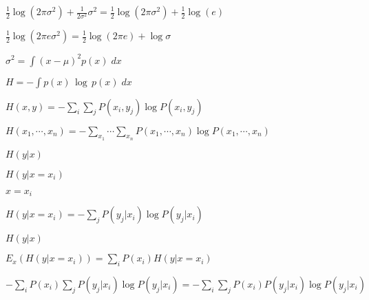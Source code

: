 \documentclass{article}
\def\lthtmlcheckvsize{\ifdim\ht\sizebox<\vsize 
  \ifdim\wd\sizebox<\hsize\expandafter\hfill\fi \expandafter\vfill
  \else\expandafter\vss\fi}%
\begin{document}
{\newpage\clearpage
{}%
$\displaystyle \frac{1}{2}\log(2\pi\sigma^2)+\frac{1}{2\sigma^2}\sigma^2
=\frac{1}{2}\log(2\pi\sigma^2)+\frac{1}{2}\log(e)$%
\lthtmlindisplaymathZ
\lthtmlcheckvsize\clearpage}

{\newpage\clearpage
{}%
$\displaystyle \frac{1}{2}\log(2\pi e\sigma^2)=\frac{1}{2}\log(2\pi e)+\log\sigma$%
\lthtmlindisplaymathZ
\lthtmlcheckvsize\clearpage}

{\newpage\clearpage
{}%
$ \sigma^2=\int (x-\mu)^2 p(x)\;dx$%
\lthtmlindisplaymathZ
\lthtmlcheckvsize\clearpage}

{\newpage\clearpage
{}%
$ H=-\int p(x)\,\log\,p(x)\;dx$%
\lthtmlindisplaymathZ
\lthtmlcheckvsize\clearpage}

{\newpage\clearpage
{}%
$\displaystyle H(x,y)=-\sum_i\sum_j P(x_i,y_j)\log P(x_i,y_j)$%
\lthtmlindisplaymathZ
\lthtmlcheckvsize\clearpage}

{\newpage\clearpage
{}%
$\displaystyle H(x_1,\cdots,x_n)=-\sum_{x_1}\cdots\sum_{x_n} P(x_1,\cdots,x_n)\log P(x_1,\cdots,x_n)$%
\lthtmlindisplaymathZ
\lthtmlcheckvsize\clearpage}

{\newpage\clearpage
{}%
$ H(y|x)$%
\lthtmlindisplaymathZ
\lthtmlcheckvsize\clearpage}

{\newpage\clearpage
{}%
$ H(y|x=x_i)$%
\lthtmlindisplaymathZ
\lthtmlcheckvsize\clearpage}

{\newpage\clearpage
{}%
$ x=x_i$%
\lthtmlindisplaymathZ
\lthtmlcheckvsize\clearpage}

{\newpage\clearpage
{}%
$\displaystyle H(y|x=x_i)=-\sum_j P(y_j|x_i) \log P(y_j|x_i)$%
\lthtmlindisplaymathZ
\lthtmlcheckvsize\clearpage}

{\newpage\clearpage
{}%
$\displaystyle H(y|x)$%
\lthtmlindisplaymathZ
\lthtmlcheckvsize\clearpage}

{\newpage\clearpage
{}%
$\displaystyle E_x\left( H(y|x=x_i) \right)
=\sum_i P(x_i) H(y|x=x_i)$%
\lthtmlindisplaymathZ
\lthtmlcheckvsize\clearpage}

{\newpage\clearpage
{}%
$\displaystyle -\sum_i P(x_i) \sum_j P(y_j|x_i) \log P(y_j|x_i)
=-\sum_i \sum_j P(x_i) P(y_j|x_i) \log P(y_j|x_i)$%
\lthtmlindisplaymathZ
\lthtmlcheckvsize\clearpage}
\end{document}
